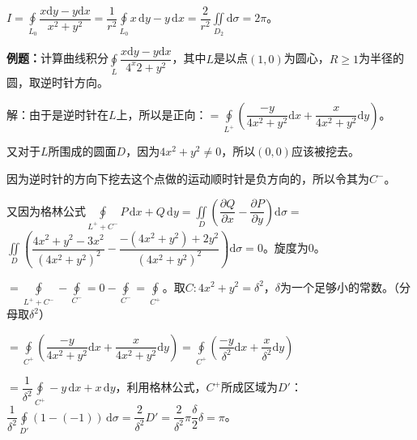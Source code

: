 \documentclass[UTF8, 12pt]{ctexart}
\begin{document}
$I=\displaystyle{\oint\limits_{L_0}\dfrac{x\textrm{d}y-y\textrm{d}x}{x^2+y^2}=\dfrac{1}{r^2}\oint\limits_{L_0}x\,\textrm{d}y-y\,\textrm{d}x=\dfrac{2}{r^2}\iint\limits_{D_2}\textrm{d}\sigma=2\pi}$。

\textbf{例题：}计算曲线积分$\oint\limits_L\dfrac{x\textrm{d}y-y\textrm{d}x}{4^x2+y^2}$，其中$L$是以点$(1,0)$为圆心，$R\geqslant1$为半径的圆，取逆时针方向。

解：由于是逆时针在$L$上，所以是正向：$=\displaystyle{\oint\limits_{L^+}\left(\dfrac{-y}{4x^2+y^2}\textrm{d}x+\dfrac{x}{4x^2+y^2}\textrm{d}y\right)}$。

又对于$L$所围成的圆面$D$，因为$4x^2+y^2\neq0$，所以$(0,0)$应该被挖去。

因为逆时针的方向下挖去这个点做的运动顺时针是负方向的，所以令其为$C^-$。

又因为格林公式$\oint\limits_{L^++C^-}P\,\textrm{d}x+Q\,\textrm{d}y=\displaystyle{\iint\limits_D\left(\dfrac{\partial Q}{\partial x}-\dfrac{\partial P}{\partial y}\right)\textrm{d}\sigma}=$\\$\displaystyle{\iint\limits_D\left(\dfrac{4x^2+y^2-3x^2}{(4x^2+y^2)^2}-\dfrac{-(4x^2+y^2)+2y^2}{(4x^2+y^2)^2}\right)\textrm{d}\sigma}=0$。旋度为0。

$=\oint\limits_{L^++C^-}-\oint\limits_{C^-}=0-\oint\limits_{C^-}=\oint\limits_{C^+}$。取$C:4x^2+y^2=\delta^2$，$\delta$为一个足够小的常数。（分母取$\delta^2$）

$=\displaystyle{\oint\limits_{C^+}\left(\dfrac{-y}{4x^2+y^2}\textrm{d}x+\dfrac{x}{4x^2+y^2}\textrm{d}y\right)}=\displaystyle{\oint\limits_{C^+}\left(\dfrac{-y}{\delta^2}\textrm{d}x+\dfrac{x}{\delta^2}\textrm{d}y\right)}$

$=\dfrac{1}{\delta^2}\oint\limits_{C^+}-y\,\textrm{d}x+x\,\textrm{d}y$，利用格林公式，$C^+$所成区域为$D'$：$\dfrac{1}{\delta^2}\oint\limits_{D'}(1-(-1))\,\textrm{d}\sigma=\dfrac{2}{\delta^2}D'=\dfrac{2}{\delta^2}\pi\dfrac{\delta}{2}\delta=\pi$。
\end{document}
